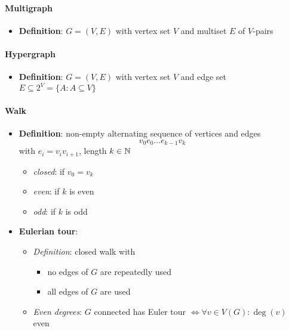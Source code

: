 \paragraph{Multigraph}
\begin{itemize}
  \item \textbf{Definition}: $ G = (V,E) $ with vertex set $ V $ and multiset $ E $ of $ V $-pairs
\end{itemize}

\paragraph{Hypergraph}
\begin{itemize}
  \item \textbf{Definition}: $ G = (V,E) $ with vertex set $ V $ and edge set $ E \subseteq 2^V = \{ A : A \subseteq V \} $
\end{itemize}

\paragraph{Walk}
\begin{itemize}
  \item \textbf{Definition}: non-empty alternating sequence of vertices and edges
    \begin{equation*}
      v_0e_0\dots e_{k-1}v_k
    \end{equation*}
    with $ e_i = v_iv_{i+1} $, length $ k \in \mathbb{N} $
    \begin{itemize}
      \item \emph{closed}: if $ v_0=v_k $
      \item \emph{even}: if $ k $ is even
      \item \emph{odd}: if $ k $ is odd
    \end{itemize}
  \item \textbf{Eulerian tour}:
  \begin{itemize}
    \item \emph{Definition}: closed walk with
    \begin{itemize}
      \item no edges of $ G $ are repeatedly used
      \item all edges of $ G $ are used 
    \end{itemize}
    \item \emph{Even degrees}: $ G $ connected has Euler tour $ \Leftrightarrow \forall v \in V(G) : \deg(v) $ even
  \end{itemize}
\end{itemize}


